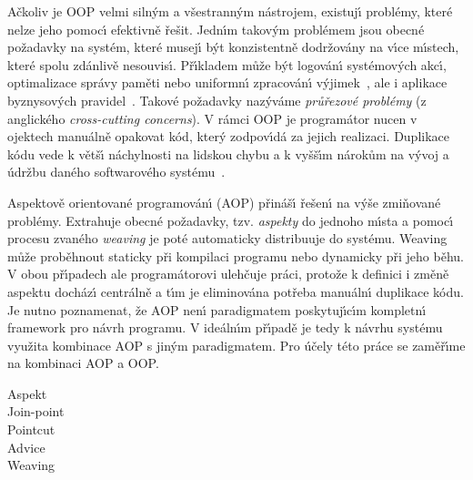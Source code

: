 Ačkoliv je \gls{OOP} velmi siln\'ym a všestrann\'ym nástrojem,
existuj\'{\i} problémy, které nelze jeho pomoc\'{\i} efektivně řešit.
Jedn\'{\i}m takov\'ym problémem jsou obecné požadavky na systém,
které musej\'{\i} b\'yt konzistentně dodržovány na v\'{\i}ce m\'{\i}stech,
které spolu zdánlivě nesouvis\'{\i}. Př\'{\i}kladem
může b\'yt logován\'{\i} systémov\'ych akc\'{\i}, optimalizace správy paměti
nebo uniformn\'{\i} zpracován\'{\i} v\'yjimek~\cite{kiczales1997aspect},
ale i aplikace byznysových pravidel~\cite{cemus2014aspect}.
Takové požadavky naz\'yváme \textit{průřezové problémy}
(z anglického \textit{cross-cutting concerns}).
V rámci \gls{OOP} je programátor nucen v ojektech manuálně opakovat
kód, kter\'y zodpov\'{\i}dá za jejich realizaci. Duplikace kódu
vede k větš\'{\i} náchylnosti na lidskou chybu a k vyšš\'{\i}m nárokům na v\'yvoj
a údržbu daného softwarového systému~\cite{fowler1999refactoring}.

Aspektově orientované programován\'{\i} (\gls{AOP}) přináš\'{\i} řešen\'{\i} na
v\'yše zmiňované problémy. Extrahuje obecné požadavky,
tzv. \textit{aspekty} do jednoho m\'{\i}sta a pomoc\'{\i} procesu zvaného
\textit{weaving} je poté automaticky distribuuje do systému.
Weaving může proběhnout staticky při kompilaci programu nebo dynamicky
při jeho běhu. V obou př\'{\i}padech ale programátorovi ulehčuje práci,
protože k definici i změně aspektu docház\'{\i} centrálně a t\'{\i}m je eliminována
potřeba manuáln\'{\i} duplikace kódu. Je nutno poznamenat, že \gls{AOP} nen\'{\i}
paradigmatem poskytuj\'{\i}c\'{\i}m kompletn\'{\i} framework pro návrh programu.
V ideáln\'{\i}m př\'{\i}padě je tedy k návrhu systému využita kombinace
\gls{AOP} s jin\'ym paradigmatem. Pro účely této práce se zaměř\'{\i}me na
kombinaci \gls{AOP} a \gls{OOP}.


\begin{description}
    \item [Aspekt]
    \item [Join-point]
    \item [Pointcut]
    \item [Advice]
    \item [Weaving]
\end{description}

